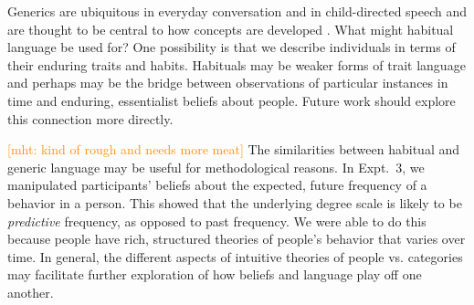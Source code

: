 \documentclass[10pt,letterpaper]{article}
\newcommand{\red}[1]{\textcolor{Red}{#1}}
\newcommand{\mht}[1]{\textcolor{DarkOrange}{[mht: #1]}}
\begin{document}
Generics are ubiquitous in everyday conversation and in child-directed speech \cite{Gelman2008} and are thought to be central to how concepts are developed \cite{Gelman2004}.
What might habitual language be used for?
One possibility is that we describe individuals in terms of their enduring traits and habits. 
Habituals may be weaker forms of trait language \cite{Gelman1999} and perhaps may be the bridge between observations of particular instances in time and enduring, essentialist beliefs about people.
Future work should explore this connection more directly.
	
\mht{kind of rough and needs more meat}
The similarities between habitual and generic language may be useful for methodological reasons. 
In Expt.~3, we manipulated participants' beliefs about the expected, future frequency of a behavior in a person.
This showed that the underlying degree scale is likely to be \emph{predictive} frequency, as opposed to past frequency. 
We were able to do this because people have rich, structured theories of people's behavior that varies over time. 
In general, the different aspects of intuitive theories of people vs. categories may facilitate further exploration of how beliefs and language play off one another.


%






\setlength{\bibleftmargin}{.125in}
\setlength{\bibindent}{-\bibleftmargin}


\end{document}
